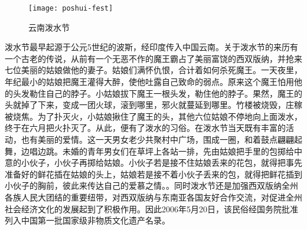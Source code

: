 \begin{figure}
    \centering
    \texttt{[image: poshui-fest]}
    \caption{云南泼水节}
\end{figure}
泼水节最早起源于公元5世纪的波斯，经印度传入中国云南。关于泼水节的来历有一个古老的传说，从前有一个无恶不作的魔王霸占了美丽富饶的西双版纳，并抢来七位美丽的姑娘做他的妻子。姑娘们满怀仇恨，合计着如何杀死魔王。一天夜里，年纪最小的姑娘把魔王灌得大醉，使他吐露自己致命的弱点。原来这个魔王怕用他的头发勒住自己的脖子。小姑娘拔下魔王一根头发，勒住他的脖子。果然，魔王的头就掉了下来，变成一团火球，滚到哪里，邪火就蔓延到哪里。竹楼被烧毁，庄稼被烧焦。为了扑灭火，小姑娘揪住了魔王的头，其他六位姑娘不停地向上面泼水，终于在六月把火扑灭了。从此，便有了泼水的习俗。在泼水节当天既有丰富的活动，也有美丽的爱情。这一天男女老少共聚村中广场，围成一圈，和着鼓点翩翩起舞，边唱边跳。未婚的青年男女们在草坪上各站一排，先由姑娘把手里的包掷给中意的小伙子，小伙子再掷给姑娘。小伙子若是接不住姑娘丢来的花包，就得把事先准备好的鲜花插在姑娘的头上，姑娘若是接不着小伙子丢来的包，就得把鲜花插到小伙子的胸前，彼此来传达自己的爱慕之情。。同时泼水节还是加强西双版纳全州各族人民大团结的重要纽带，对西双版纳与东南亚各国友好合作交流，对促进全州社会经济文化的发展起到了积极作用。因此2006年5月20日，该民俗经国务院批准列入中国第一批国家级非物质文化遗产名录。